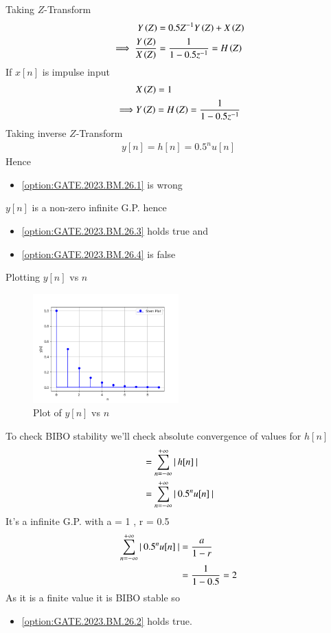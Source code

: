 \documentclass[journal,12pt,twocolumn]{IEEEtran}
\begin{document}
Taking $Z$-Transform 
\begin{align}
Y\left(Z\right) &= 0.5Z^{-1}Y\left(Z\right) + X\left(Z\right) \\
\implies \frac{Y\left(Z\right)}{X\left(Z\right)} &= \frac{1}{1 - 0.5z^{-1}} = H\left(Z\right) 
\end{align}
If $x[n]$ is impulse input 
\begin{align}
& X\left(Z\right) = 1 \\
\implies &Y\left(Z\right) = H\left(Z\right) = \frac{1}{1 - 0.5z^{-1}} 
\end{align}
Taking inverse $Z$-Transform
\begin{align}
y[n] = h[n] = 0.5^{n}u[n]
\end{align}
Hence 
\begin{itemize}
	\item	\ref{option:GATE.2023.BM.26.1} is wrong\\
\end{itemize}
$y[n]$ is a non-zero infinite G.P. hence 
\begin{itemize}
	\item	\ref{option:GATE.2023.BM.26.3} holds true and 
	\item   \ref{option:GATE.2023.BM.26.4} is false
\end{itemize}
\pagebreak
Plotting $y[n]$ vs $n$
\begin{figure}[h]
    \includegraphics[width=0.5\textwidth]{figs/fig1.png}
    \caption{Plot of $y[n]$ vs $n$}
    \label{fig:GATE.2023.BM.26.1}
\end{figure}


To check BIBO stability we'll check absolute convergence of values for $h[n]$
\begin{align}
&= \sum^{+\infty}_{n = -\infty}\left\vert\:h[n]\:\right\vert \\
&= \sum^{+\infty}_{n = -\infty}\left\vert\:0.5^nu[n]\:\right\vert
\end{align}
It's a infinite G.P. with a = 1 , r = 0.5
\begin{align}
\sum^{+\infty}_{n = -\infty}\left\vert\:0.5^nu[n]\:\right\vert &= \frac{a}{1 -r} \\
&= \frac{1}{1 - 0.5} = 2
\end{align}
As it is a finite value it is BIBO stable so 
\begin{itemize}
	\item \ref{option:GATE.2023.BM.26.2} holds true.
\end{itemize}
\end{document}
